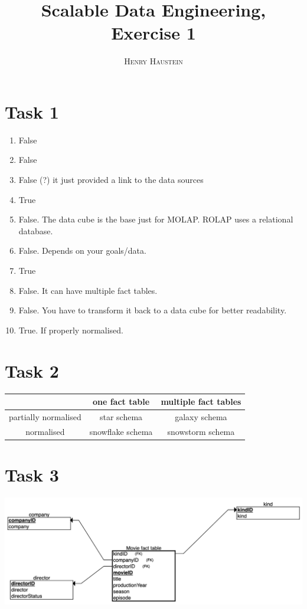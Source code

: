 \documentclass{article}
\title{\textbf{Scalable Data Engineering, Exercise 1}}
\author{\textsc{Henry Haustein}}
\date{}
\begin{document}
	\maketitle
	
	\section*{Task 1}
	\begin{enumerate}[label=(\alph*)]
		\item False
		\item False
		\item False (?) it just provided a link to the data sources
		\item True
		\item False. The data cube is the base just for MOLAP. ROLAP uses a relational database.
		\item False. Depends on your goals/data.
		\item True
		\item False. It can have multiple fact tables.
		\item False. You have to transform it back to a data cube for better readability.
		\item True. If properly normalised.
	\end{enumerate}

	\section*{Task 2}
	\begin{center}
		\begin{tabular}{c|c|c}
			& one fact table & multiple fact tables \\
			\hline
			partially normalised & star schema & galaxy schema \\
			\hline
			normalised & snowflake schema & snowstorm schema
		\end{tabular}
	\end{center}
	
	\section*{Task 3}
	\begin{center}
		\includegraphics[scale=0.15]{task1.3}
	\end{center}
	
\end{document}
